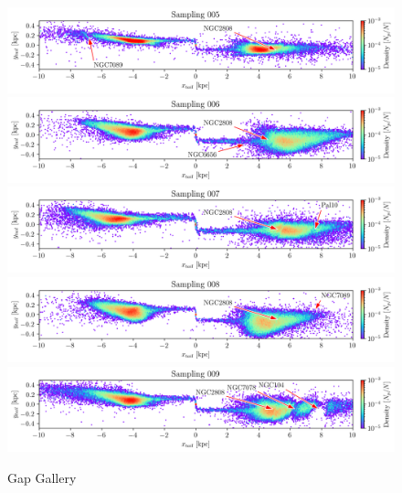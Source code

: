 \documentclass[draft]{aa}
\begin{document}
\begin{appendix}
    \begin{figure}
      \centering
      \includegraphics[width=\linewidth]{gallery_of_gaps_monte-carlo-005.png}
      \includegraphics[width=\linewidth]{gallery_of_gaps_monte-carlo-006.png}
      \includegraphics[width=\linewidth]{gallery_of_gaps_monte-carlo-007.png}
      \includegraphics[width=\linewidth]{gallery_of_gaps_monte-carlo-008.png}
      \includegraphics[width=\linewidth]{gallery_of_gaps_monte-carlo-009.png}
      \caption{Gap Gallery}
      \label{fig:TailCoordinates}
    \end{figure}        



\end{appendix}
\end{document}
